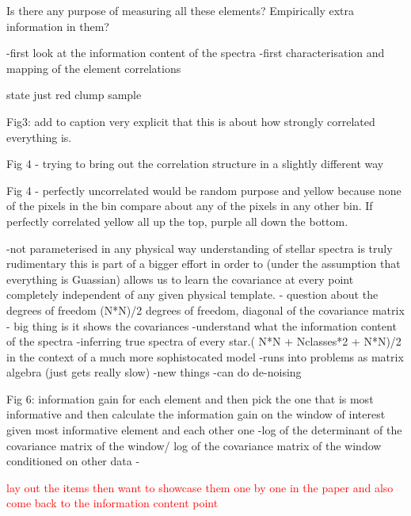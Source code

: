 \documentclass[a4paper,fleqn,usenatbib]{mnras}
\begin{document}
Is there any purpose of measuring all these elements? Empirically extra information in them? 

-first look at the information content of the spectra
-first characterisation and mapping of the element correlations

state just red clump sample 

Fig3: add to caption very explicit that this is about how strongly correlated everything is. 

Fig 4 - trying to bring out the correlation structure in a slightly different way

Fig 4 - perfectly uncorrelated would be random purpose and yellow because none of the pixels in the bin compare about any of the pixels in any other bin. If perfectly correlated yellow all up the top, purple all down the bottom. 

-not parameterised in any physical way
understanding of stellar spectra is truly rudimentary 
this is part of a bigger effort in order to (under the assumption that everything is Guassian) allows us to learn the covariance at every point completely independent of any given physical template. 
- question about the degrees of freedom (N*N)/2 degrees of freedom, diagonal of the covariance matrix
- big thing is it shows the covariances
-understand what the information content of the spectra
-inferring true spectra of every star.( N*N + Nclasses*2 + N*N)/2
in the context of a much more sophistocated model 
-runs into problems as matrix algebra (just gets really slow) 
-new things
-can do de-noising 

Fig 6: information gain for each element and then pick the one that is most informative and then calculate the information gain on the window of interest given most informative element and each other one
-log of the determinant of the covariance matrix of the window/ log of the covariance matrix of the window conditioned on other data
-

\textcolor{red}{lay out the items then want to showcase them one by one in the paper and also come back to the information content point}
\end{document}
